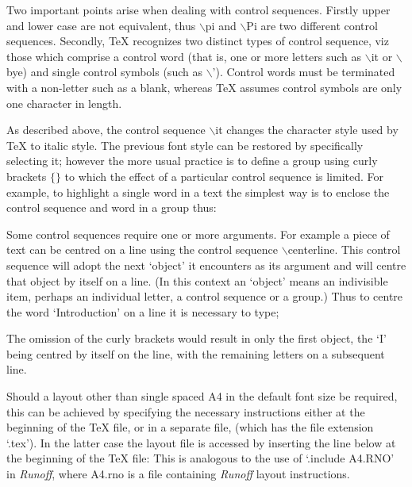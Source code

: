 Two important points arise when dealing with control sequences.
Firstly upper and lower case are not equivalent, thus $\backslash$pi and
$\backslash$Pi are two different control sequences.
Secondly, {\TeX} recognizes two distinct types of control sequence, viz
those which comprise a control word (that is, one or more letters
such as $\backslash$it or $\backslash$bye) and single control symbols
(such as $\backslash$').
Control words must be terminated with a non-letter such as a blank,
whereas {\TeX} assumes control symbols are only one character in length.



As described above, the control sequence $\backslash$it changes the
character style used by {\TeX} to italic style.
The previous font style can be restored by specifically selecting it;
however the more usual practice is to define a group using curly brackets
$\{$$\}$ to which the effect of a particular control sequence is limited.
For example, to highlight a single word in a text the simplest
way is to enclose the control sequence and word in a group thus:
\medskip
{}

Some control sequences require one or more arguments. For example a
piece of text can be centred on a line using the control sequence
$\backslash$centerline.
This control sequence will adopt the next `object' it encounters as
its argument and will centre that object  by itself on a line.
(In this context an `object' means an indivisible item, perhaps an individual
letter, a control sequence or a group.)
Thus to centre the word `Introduction' on a line it is necessary to
type;
\medskip
{}

The omission of the curly brackets would result in only the first object,
the `I' being centred by itself on the line, with the remaining letters on
a subsequent line.



Should a layout other than single spaced A4 in the default
font size be required,
this can be achieved by specifying the necessary instructions either
at the beginning of the {\TeX} file, or in a separate file, (which has the
file extension `.tex').
In the latter case the layout file is accessed by inserting the line below
at the beginning of the {\TeX} file:
\medskip
{}
This is analogous to the use of `.include A4.RNO' in {\it Runoff}, where
A4.rno is a file containing {\it Runoff} layout instructions.


